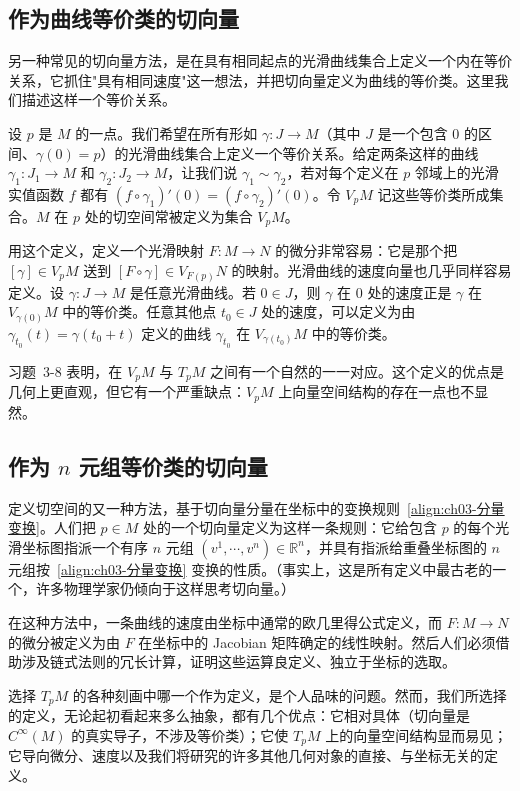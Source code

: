 \documentclass[../../main.tex]{subfiles}
\begin{document}
\subsection{作为曲线等价类的切向量}\label{subsection:ch03-作为曲线等价类的切向量}

另一种常见的切向量方法，是在具有相同起点的光滑曲线集合上定义一个内在等价关系，它抓住"具有相同速度"这一想法，并把切向量定义为曲线的等价类。这里我们描述这样一个等价关系。

设 $p$ 是 $M$ 的一点。我们希望在所有形如 $\gamma:J\to M$（其中 $J$ 是一个包含 $0$ 的区间、$\gamma(0)=p$）的光滑曲线集合上定义一个等价关系。给定两条这样的曲线 $\gamma_{1}:J_{1}\to M$ 和 $\gamma_{2}:J_{2}\to M$，让我们说 $\gamma_{1}\sim\gamma_{2}$，若对每个定义在 $p$ 邻域上的光滑实值函数 $f$ 都有 $(f\circ\gamma_{1})'(0)=(f\circ\gamma_{2})'(0)$。令 $V_{p}M$ 记这些等价类所成集合。$M$ 在 $p$ 处的切空间常被定义为集合 $V_{p}M$。

用这个定义，定义一个光滑映射 $F:M\to N$ 的微分非常容易：它是那个把 $[\gamma]\in V_{p}M$ 送到 $[F\circ\gamma]\in V_{F(p)}N$ 的映射。光滑曲线的速度向量也几乎同样容易定义。设 $\gamma:J\to M$ 是任意光滑曲线。若 $0\in J$，则 $\gamma$ 在 $0$ 处的速度正是 $\gamma$ 在 $V_{\gamma(0)}M$ 中的等价类。任意其他点 $t_{0}\in J$ 处的速度，可以定义为由 $\gamma_{t_{0}}(t)=\gamma(t_{0}+t)$ 定义的曲线 $\gamma_{t_{0}}$ 在 $V_{\gamma(t_{0})}M$ 中的等价类。

习题~3-8 表明，在 $V_{p}M$ 与 $T_{p}M$ 之间有一个自然的一一对应。这个定义的优点是几何上更直观，但它有一个严重缺点：$V_{p}M$ 上向量空间结构的存在一点也不显然。

\subsection{作为 $n$ 元组等价类的切向量}\label{subsection:ch03-作为n元组等价类的切向量}

定义切空间的又一种方法，基于切向量分量在坐标中的变换规则~\eqref{align:ch03-分量变换}。人们把 $p\in M$ 处的一个切向量定义为这样一条规则：它给包含 $p$ 的每个光滑坐标图指派一个有序 $n$ 元组 $(v^{1},\cdots ,v^{n})\in\mathbb{R}^{n}$，并具有指派给重叠坐标图的 $n$ 元组按~\eqref{align:ch03-分量变换} 变换的性质。（事实上，这是所有定义中最古老的一个，许多物理学家仍倾向于这样思考切向量。）

在这种方法中，一条曲线的速度由坐标中通常的欧几里得公式定义，而 $F:M\to N$ 的微分被定义为由 $F$ 在坐标中的 Jacobian 矩阵确定的线性映射。然后人们必须借助涉及链式法则的冗长计算，证明这些运算良定义、独立于坐标的选取。

选择 $T_{p}M$ 的各种刻画中哪一个作为定义，是个人品味的问题。然而，我们所选择的定义，无论起初看起来多么抽象，都有几个优点：它相对具体（切向量是 $C^{\infty}(M)$ 的真实导子，不涉及等价类）；它使 $T_{p}M$ 上的向量空间结构显而易见；它导向微分、速度以及我们将研究的许多其他几何对象的直接、与坐标无关的定义。
\end{document}
